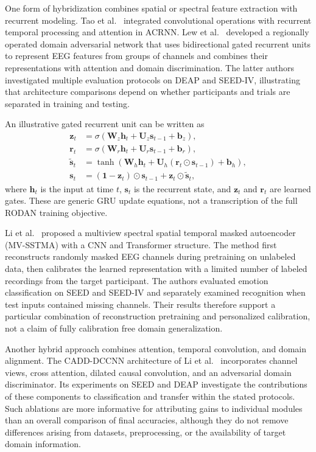 \documentclass[ASNA,twocolumn]{USG}
\begin{document}
One form of hybridization combines spatial or spectral feature extraction with recurrent modeling. Tao et al.~\cite{tao2020eeg} integrated convolutional operations with recurrent temporal processing and attention in ACRNN. Lew et al.~\cite{lew2020eeg} developed a regionally operated domain adversarial network that uses bidirectional gated recurrent units to represent EEG features from groups of channels and combines their representations with attention and domain discrimination. The latter authors investigated multiple evaluation protocols on DEAP and SEED-IV, illustrating that architecture comparisons depend on whether participants and trials are separated in training and testing.

An illustrative gated recurrent unit can be written as
\begin{align}
\mathbf{z}_t
&=\sigma(\mathbf{W}_z\mathbf{h}_t+
\mathbf{U}_z\mathbf{s}_{t-1}+\mathbf{b}_z),\\
\mathbf{r}_t
&=\sigma(\mathbf{W}_r\mathbf{h}_t+
\mathbf{U}_r\mathbf{s}_{t-1}+\mathbf{b}_r),\\
\widetilde{\mathbf{s}}_t
&=\tanh\!\left(
\mathbf{W}_h\mathbf{h}_t+
\mathbf{U}_h(\mathbf{r}_t\odot\mathbf{s}_{t-1})
+\mathbf{b}_h
\right),\\
\mathbf{s}_t
&=(\mathbf{1}-\mathbf{z}_t)\odot
\mathbf{s}_{t-1}
+\mathbf{z}_t\odot\widetilde{\mathbf{s}}_t,
\label{eq:deep_generic_gru}
\end{align}
where $\mathbf{h}_t$ is the input at time $t$, $\mathbf{s}_t$ is the recurrent state, and $\mathbf{z}_t$ and $\mathbf{r}_t$ are learned gates. These are generic GRU update equations, not a transcription of the full RODAN training objective.

Li et al.~\cite{li2022multi} proposed a multiview spectral spatial temporal masked autoencoder (MV-SSTMA) with a CNN and Transformer structure. The method first reconstructs randomly masked EEG channels during pretraining on unlabeled data, then calibrates the learned representation with a limited number of labeled recordings from the target participant. The authors evaluated emotion classification on SEED and SEED-IV and separately examined recognition when test inputs contained missing channels. Their results therefore support a particular combination of reconstruction pretraining and personalized calibration, not a claim of fully calibration free domain generalization.

Another hybrid approach combines attention, temporal convolution, and domain alignment. The CADD-DCCNN architecture of Li et al.~\cite{li2024multi} incorporates channel views, cross attention, dilated causal convolution, and an adversarial domain discriminator. Its experiments on SEED and DEAP investigate the contributions of these components to classification and transfer within the stated protocols. Such ablations are more informative for attributing gains to individual modules than an overall comparison of final accuracies, although they do not remove differences arising from datasets, preprocessing, or the availability of target domain information.
\end{document}
